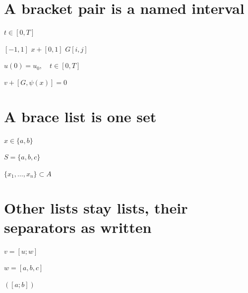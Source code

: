 \documentclass{article}
\begin{document}
\section{A bracket pair is a named interval}
$t\in[0,T]$

$[-1,1]$ $x+[0,1]$ $G[i,j]$

$u(0)=u_{0},\quad t\in[0,T]$

$v+[G,\psi(x)]=0$

\section{A brace list is one set}
$x\in\{a,b\}$

$S=\{a,b,c\}$

$\{x_1,\dots,x_n\}\subset A$

\section{Other lists stay lists, their separators as written}
$v=[u;w]$

$w=[a,b,c]$

$\left([a;b]\right)$
\end{document}
